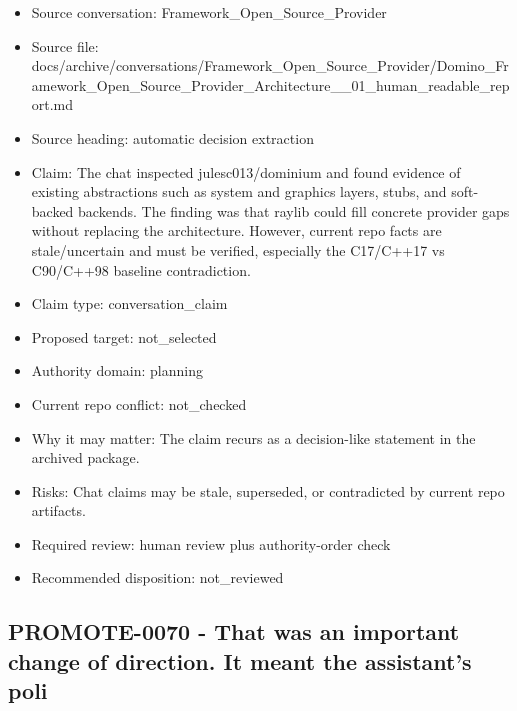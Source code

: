 \documentclass[11pt,a4paper]{report}
\begin{document}
\begin{itemize}
\item Source conversation: Framework\_Open\_Source\_Provider
\item Source file: docs/archive/conversations/Framework\_Open\_Source\_Provider/Domino\_Framework\_Open\_Source\_Provider\_Architecture\_\_01\_human\_readable\_report.md
\item Source heading: automatic decision extraction
\item Claim: The chat inspected julesc013/dominium and found evidence of existing abstractions such as system and graphics layers, stubs, and soft-backed backends. The finding was that raylib could fill concrete provider gaps without replacing the architecture. However, current repo facts are stale/uncertain and must be verified, especially the C17/C++17 vs C90/C++98 baseline contradiction.
\item Claim type: conversation\_claim
\item Proposed target: not\_selected
\item Authority domain: planning
\item Current repo conflict: not\_checked
\item Why it may matter: The claim recurs as a decision-like statement in the archived package.
\item Risks: Chat claims may be stale, superseded, or contradicted by current repo artifacts.
\item Required review: human review plus authority-order check
\item Recommended disposition: not\_reviewed
\end{itemize}

\subsection{PROMOTE-0070 - That was an important change of direction. It meant the assistant's poli}
\end{document}
